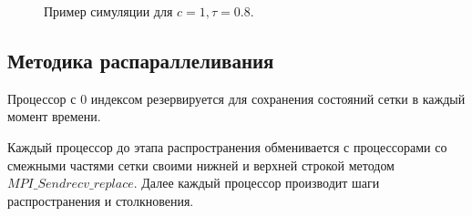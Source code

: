 		\begin{figure}[ht]
			\begin{minipage}[ht]{0.49\linewidth}
				\center{\texttt{[image: 0000]}\textbf{\\ ~}}
			\end{minipage}
			\hfill
			\begin{minipage}[ht]{0.49\linewidth}
				\center{\texttt{[image: 0001]}\\ ~}
			\end{minipage}
			\vfill
			\begin{minipage}[ht]{0.49\linewidth}
				\center{\texttt{[image: 0002]}\\ ~}
			\end{minipage}
			\hfill
			\begin{minipage}[ht]{0.49\linewidth}
				\center{\texttt{[image: 0003]} \\ ~ }
			\end{minipage}
			\vfill
			\begin{minipage}[ht]{0.49\linewidth}
				\center{\texttt{[image: 0004]}\\ ~}
			\end{minipage}
			\hfill
			\begin{minipage}[ht]{0.49\linewidth}
				\center{\texttt{[image: 0005]}\\ ~}
			\end{minipage}
			\vfill
			\begin{minipage}[ht]{0.49\linewidth}
				\center{\texttt{[image: 0006]}\\ ~}
			\end{minipage}
			\hfill
			\begin{minipage}[ht]{0.49\linewidth}
				\center{\texttt{[image: 0007]}\\ ~}
			\end{minipage}
			\vfill
			\caption{Пример симуляции для $ c=1, \tau = 0.8 $.}
			\label{fig:example}  
		\end{figure}
			
		\FloatBarrier
		\subsection{Методика распараллеливания}
			Процессор с 0 индексом резервируется для сохранения состояний сетки в каждый момент времени.
			
			Каждый процессор до этапа распространения обменивается с процессорами со смежными частями сетки своими нижней и верхней строкой методом $ MPI\_Sendrecv\_replace $. Далее каждый процессор производит шаги распространения и столкновения. 
			
